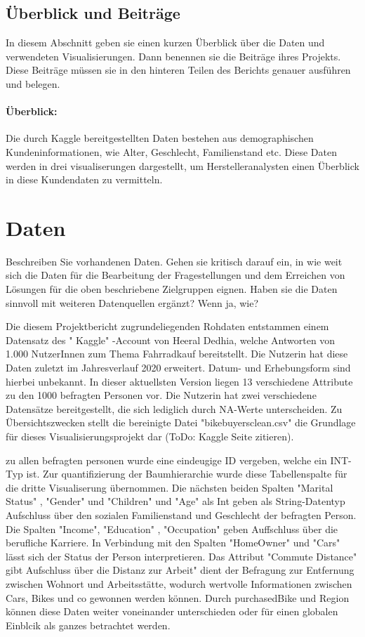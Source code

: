 \documentclass[usegeometry=true]{scrartcl}
\begin{document}
\subsection{Überblick und Beiträge}
In diesem Abschnitt geben sie einen kurzen Überblick über die Daten und verwendeten Visualisierungen. Dann benennen sie die Beiträge ihres Projekts. Diese Beiträge müssen sie in den hinteren Teilen des Berichts genauer ausführen und belegen.
\paragraph{Überblick:}
Die durch Kaggle bereitgestellten Daten bestehen aus demographischen Kundeninformationen, wie Alter, Geschlecht, Familienstand etc. Diese Daten werden in drei visualiserungen dargestellt, um Herstelleranalysten einen Überblick in diese Kundendaten zu vermitteln.

\section{Daten}
Beschreiben Sie vorhandenen Daten. Gehen sie kritisch darauf ein, in wie weit sich die Daten für die Bearbeitung der Fragestellungen und dem Erreichen von Lösungen für die oben beschriebene Zielgruppen eignen. Haben sie die Daten sinnvoll mit weiteren Datenquellen ergänzt? Wenn ja, wie?

Die diesem Projektbericht zugrundeliegenden Rohdaten entstammen einem Datensatz des " Kaggle" -Account von Heeral Dedhia, welche Antworten von 1.000 NutzerInnen zum Thema Fahrradkauf bereitstellt. Die Nutzerin hat diese Daten zuletzt im Jahresverlauf 2020 erweitert. Datum- und Erhebungsform sind hierbei unbekannt. In dieser aktuellsten Version liegen 13 verschiedene Attribute zu den 1000 befragten Personen vor. Die Nutzerin hat zwei verschiedene Datensätze bereitgestellt, die sich lediglich durch NA-Werte unterscheiden. Zu Übersichtszwecken stellt die bereinigte Datei "bikebuyersclean.csv" die Grundlage für dieses Visualisierungsprojekt dar (ToDo: Kaggle Seite zitieren). 

zu allen befragten personen wurde eine eindeugige ID vergeben, welche ein INT-Typ ist. Zur quantifizierung der Baumhierarchie wurde diese Tabellenspalte für die dritte Visualiserung übernommen. Die nächsten beiden Spalten "Marital Status" , "Gender" und "Children" und "Age" als Int geben als String-Datentyp Aufschluss über den sozialen  Familienstand und Geschlecht der befragten Person. Die Spalten "Income", "Education" , "Occupation" geben Auffschluss über die berufliche Karriere. In Verbindung mit den Spalten "HomeOwner" und "Cars" lässt sich der Status der Person interpretieren. Das Attribut "Commute Distance" gibt Aufschluss über die Distanz zur Arbeit" dient der Befragung zur Entfernung zwischen Wohnort und Arbeitsstätte, wodurch wertvolle Informationen zwischen Cars, Bikes und co gewonnen werden können. Durch purchasedBike und Region können diese Daten weiter voneinander unterschieden oder für einen globalen Einblcik als ganzes betrachtet werden. 
\end{document}
